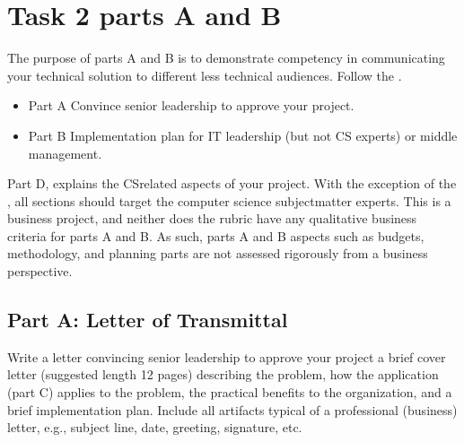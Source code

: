 \documentclass[letterpaper,10pt,english]{jupyterBook}
\begin{document}
\sphinxstepscope


\section{Task 2 parts A and B}
\label{\detokenize{task2_doc/task2_doc_a_and_b:task-2-parts-a-and-b}}\label{\detokenize{task2_doc/task2_doc_a_and_b:task2ab}}\label{\detokenize{task2_doc/task2_doc_a_and_b::doc}}
\sphinxAtStartPar
The purpose of parts A and B is to demonstrate competency in communicating your technical solution to different less technical audiences. Follow the .
\begin{itemize}
\item {} 
\sphinxAtStartPar
Part A \sphinxhyphen{} Convince senior leadership to approve your project.

\item {} 
\sphinxAtStartPar
Part B \sphinxhyphen{} Implementation plan for IT leadership (but not CS experts) or middle management.

\end{itemize}

\sphinxAtStartPar
Part D, explains the CS\sphinxhyphen{}related aspects of your project. With the exception of the , all sections should target the computer science subject\sphinxhyphen{}matter experts. This is  a business project, and neither does the rubric have any qualitative business criteria for parts A and B. As such, parts A and B aspects such as budgets, methodology, and planning parts are not assessed rigorously from a business perspective.


\subsection{Part A: Letter of Transmittal}
\label{\detokenize{task2_doc/task2_doc_a_and_b:part-a-letter-of-transmittal}}\label{\detokenize{task2_doc/task2_doc_a_and_b:task2-parta}}
\sphinxAtStartPar
Write a letter convincing senior leadership to approve your project \sphinxhyphen{}a brief cover letter (suggested length 1\sphinxhyphen{}2 pages) describing the problem, how the application (part C) applies to the problem, the practical benefits to the organization, and a brief implementation plan. Include all artifacts typical of a professional (business) letter, e.g., subject line, date, greeting, signature, etc. 
\end{document}
